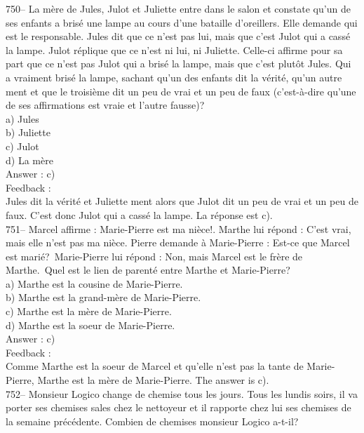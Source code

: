 \documentclass[letterpaper, 12pt]{article}
\begin{document}
750-- La m\`ere de Jules, Julot et Juliette entre dans le salon et constate
qu'un de ses enfants a bris\'e une lampe au cours d'une bataille
d'oreillers.  Elle demande qui est le responsable. Jules dit que ce n'est
pas lui, mais que c'est Julot qui a cass\'e la lampe.  Julot r\'eplique que
ce n'est ni lui, ni Juliette.  Celle-ci affirme pour sa part que ce n'est
pas Julot qui a bris\'e la lampe, mais que c'est plut\^ot Jules.  Qui a
vraiment bris\'e la lampe, sachant qu'un des enfants dit la v\'erit\'e,
qu'un autre ment et que le troisi\`eme dit un peu de vrai et un peu de faux
(c'est-\`a-dire qu'une de ses affirmations est vraie et l'autre fausse)?\\
a) Jules\\
b) Juliette\\
c) Julot\\
d) La m\`ere\\

Answer : c)\\

Feedback : \\
Jules dit la v\'erit\'e et Juliette ment alors que Julot dit un peu de vrai
et un peu de faux.  C'est donc Julot qui a cass\'e la lampe. La r\'eponse
est c).\\

751-- Marcel affirme : \og Marie-Pierre est ma ni\`ece!\fg .  Marthe
lui r\'epond : \og C'est vrai, mais elle n'est pas ma ni\`ece\fg .
Pierre demande \`a Marie-Pierre : \og Est-ce que Marcel est
mari\'e?\fg\ Marie-Pierre lui r\'epond : \og Non, mais Marcel est le
fr\`ere de Marthe.\fg\  Quel est le lien de parent\'e
entre Marthe et Marie-Pierre?\\
a) Marthe est la cousine de Marie-Pierre.\\
b) Marthe est la grand-m\`ere de Marie-Pierre.\\
c) Marthe est la m\`ere de Marie-Pierre.\\
d) Marthe est la soeur de Marie-Pierre.\\

Answer : c)\\

Feedback : \\
Comme Marthe est la soeur de Marcel et qu'elle n'est pas la tante de
Marie-Pierre, Marthe est la m\`ere de Marie-Pierre.  The answer is c).\\

752-- Monsieur Logico change de chemise tous les jours.  Tous les lundis
soirs, il va porter ses chemises sales chez le nettoyeur et il rapporte chez
lui ses chemises de la semaine pr\'ec\'edente.  Combien de chemises monsieur
Logico a-t-il?\\
\end{document}
